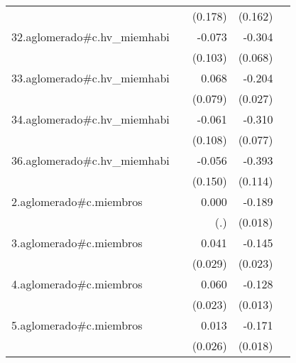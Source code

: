 {\begin{longtable}{l*{4}{D{.}{.}{-1}}}
            &                     &     (0.178)         &     (0.162)         &                     \\
\addlinespace
32.aglomerado#c.hv\_miemhabi&                     &      -0.073         &      -0.304\sym{***}&                     \\
            &                     &     (0.103)         &     (0.068)         &                     \\
\addlinespace
33.aglomerado#c.hv\_miemhabi&                     &       0.068         &      -0.204\sym{***}&                     \\
            &                     &     (0.079)         &     (0.027)         &                     \\
\addlinespace
34.aglomerado#c.hv\_miemhabi&                     &      -0.061         &      -0.310\sym{***}&                     \\
            &                     &     (0.108)         &     (0.077)         &                     \\
\addlinespace
36.aglomerado#c.hv\_miemhabi&                     &      -0.056         &      -0.393\sym{***}&                     \\
            &                     &     (0.150)         &     (0.114)         &                     \\
\addlinespace
2.aglomerado#c.miembros&                     &       0.000         &      -0.189\sym{***}&                     \\
            &                     &         (.)         &     (0.018)         &                     \\
\addlinespace
3.aglomerado#c.miembros&                     &       0.041         &      -0.145\sym{***}&                     \\
            &                     &     (0.029)         &     (0.023)         &                     \\
\addlinespace
4.aglomerado#c.miembros&                     &       0.060\sym{**} &      -0.128\sym{***}&                     \\
            &                     &     (0.023)         &     (0.013)         &                     \\
\addlinespace
5.aglomerado#c.miembros&                     &       0.013         &      -0.171\sym{***}&                     \\
            &                     &     (0.026)         &     (0.018)         &                     \\

\end{longtable}}
